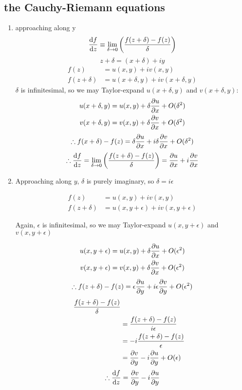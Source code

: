 \documentclass[10pt, a4paper, twocolumn]{article}
\begin{document}
\subsection{the Cauchy-Riemann equations}
\begin{enumerate}
\item approaching along y
\[\dv{f}{z} \equiv \lim _{\delta \rightarrow 0}
\pqty{\frac{f(z+\delta)-f(z)}{\delta}}\]
\[z+\delta = (x+\delta)+iy\]
\begin{equation*}
\begin{aligned}
f(z)&=u(x,y)+iv(x,y)
\\f(z+\delta)&=u(x+\delta,y)+iv(x+\delta,y)
\end{aligned}
\end{equation*}
$\delta$ is infinitesimal, so we may Taylor-expand $u(x+\delta,y)$ and $v(x+\delta,y)$:
\begin{equation*}
\begin{aligned}
u(x+\delta,y)&=u(x,y)+\delta\pdv{u}{x}(x,y)+O(\delta ^2)
\\v(x+\delta,y)&=v(x,y)+\delta\pdv{v}{x}(x,y)+O(\delta ^2)
\end{aligned}
\end{equation*}
\[\therefore
f(x+\delta)-f(z)=\delta\pdv{u}{x}+i\delta\pdv{v}{x}
+O(\delta ^2)\]
\[\therefore
\dv{f}{z}=\lim_{\delta\rightarrow 0}
\pqty{\frac{f(z+\delta)-f(z)}{\delta}}
=\pdv{u}{x}+i\pdv{v}{x}\]

\item Approaching along $y$, $\delta$ is purely imaginary, so $\delta = i\epsilon$

\begin{equation*}
\begin{aligned}
f(z)&=u(x,y)+iv(x,y)
\\f(z+\delta)&=u(x,y+\epsilon)+iv(x,y+\epsilon)
\end{aligned}
\end{equation*}

Again, $\epsilon$ is infinitesimal, so we may Taylor-expand $u(x,y+\epsilon)$ and $v(x,y+\epsilon)$

\begin{equation*}
\begin{aligned}
u(x,y+\epsilon)
&= u(x,y)+\delta\pdv{u}{x}(x,y)+O(\epsilon ^2)
\\v(x,y+\epsilon)
&=v(x,y)+\delta\pdv{v}{x}(x,y)+O(\epsilon ^2)
\end{aligned}
\end{equation*}
\[\therefore f(z+\delta)-f(z)
=\epsilon\pdv{u}{y}+i\epsilon\pdv{v}{y}+O(\epsilon ^2)\]
\begin{equation*}
\begin{aligned}
\frac{f(z+\delta)-f(z)}{\delta}
\\&=\frac{f(z+\delta)-f(z)}{i\epsilon}
\\&=-i\frac{f(z+\delta)-f(z)}{\epsilon}
\\&=\pdv{v}{y}-i\pdv{u}{y}+O(\epsilon)
\end{aligned}
\end{equation*}
\[\therefore
\dv{f}{z}=\pdv{v}{y}-i\pdv{u}{y}\]
\end{enumerate}
\end{document}

